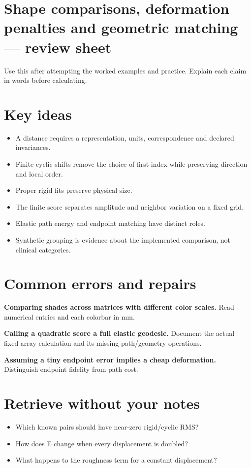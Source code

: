 \documentclass[11pt,letterpaper]{article}
\theoremstyle{definition}\newtheorem{definition}{Definition}\newtheorem{example}{Example}
\numberwithin{equation}{section}
\begin{document}
\section*{Shape comparisons, deformation penalties and geometric matching --- review sheet}
Use this after attempting the worked examples and practice. Explain each claim in words before calculating.

\section*{Key ideas}
\begin{itemize}
\item A distance requires a representation, units, correspondence and declared invariances.
\item Finite cyclic shifts remove the choice of first index while preserving direction and local order.
\item Proper rigid fits preserve physical size.
\item The finite score separates amplitude and neighbor variation on a fixed grid.
\item Elastic path energy and endpoint matching have distinct roles.
\item Synthetic grouping is evidence about the implemented comparison, not clinical categories.
\end{itemize}
\section*{Common errors and repairs}
\textbf{Comparing shades across matrices with different color scales.} Read numerical entries and each colorbar in mm.

\textbf{Calling a quadratic score a full elastic geodesic.} Document the actual fixed-array calculation and its missing path/geometry operations.

\textbf{Assuming a tiny endpoint error implies a cheap deformation.} Distinguish endpoint fidelity from path cost.

\section*{Retrieve without your notes}
\begin{itemize}
\item Which known pairs should have near-zero rigid/cyclic RMS?
\item How does E change when every displacement is doubled?
\item What happens to the roughness term for a constant displacement?
\end{itemize}
\end{document}
